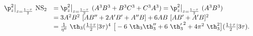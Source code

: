 \begin{equation}
  \begin{array}{rl}
    \p_z^2\big|_{z={1-\tau\over 2}} ~{\rm NS}_2
&= \p_z^2\big|_{z={1-\tau\over 2}} ~(A^3 B^3 +B^3 C^3 +C^3 A^3 ) 
= \p_z^2\big|_{z={1-\tau\over 2}} ~(A^3 B^3 )\\ 
&= 3 A^2 B^2 ~[AB'' +2 A'B'+ A''B] + 6AB~[AB'+A'B]^2 \\
&=  {1\over\eta^6} ~\th_3({1+\tau\over 2}|3\tau)^4 ~\big[
-6 ~\th_3 \th_3'' + 6 ~{\th_3'}^2 +4\pi^2 ~\th_3^2 \big]
({1+\tau\over 2}|3\tau). 
  \end{array}
\end{equation}

